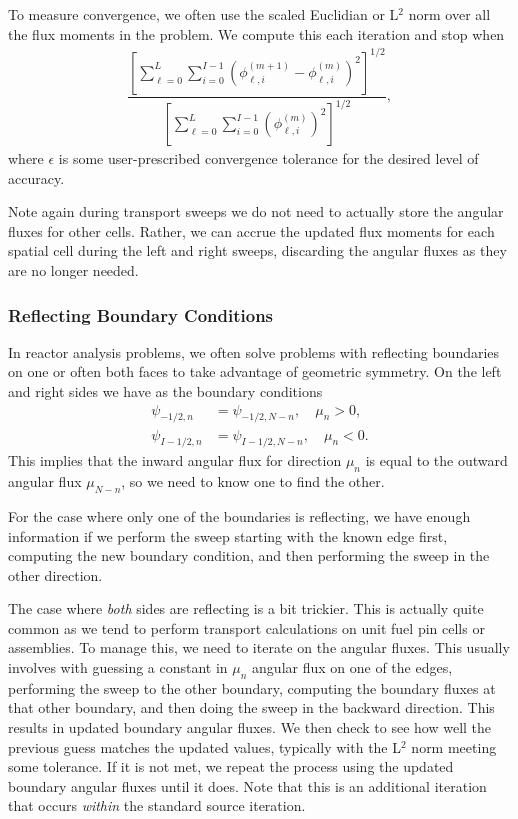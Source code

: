 To measure convergence, we often use the scaled Euclidian or L$^2$ norm over all the flux moments in the problem. We compute this each iteration and stop when
\begin{align}
  \dfrac{ \left[ \displaystyle\sum_{\ell=0}^L \sum_{i=0}^{I-1} \left( \phi_{\ell,i}^{(m+1)} - \phi_{\ell,i}^{(m)} \right)^2 \right]^{1/2} }{ \left[ \displaystyle\sum_{\ell=0}^L \sum_{i=0}^{I-1} \left( \phi_{\ell,i}^{(m)} \right)^2 \right]^{1/2} },
\end{align}
where $\epsilon$ is some user-prescribed convergence tolerance for the desired level of accuracy.

Note again during transport sweeps we do not need to actually store the angular fluxes for other cells. Rather, we can accrue the updated flux moments for each spatial cell during the left and right sweeps, discarding the angular fluxes as they are no longer needed.

\subsubsection{Reflecting Boundary Conditions}

In reactor analysis problems, we often solve problems with reflecting boundaries on one or often both faces to take advantage of geometric symmetry. On the left and right sides we have as the boundary conditions
\begin{subequations}
\begin{align}
  \psi_{-1/2,n}  &= \psi_{-1/2,N-n}, \quad \mu_n > 0, \\
  \psi_{I-1/2,n} &= \psi_{I-1/2,N-n}, \quad \mu_n < 0.
\end{align}
\end{subequations}
This implies that the inward angular flux for direction $\mu_n$ is equal to the outward angular flux $\mu_{N-n}$, so we need to know one to find the other.

For the case where only one of the boundaries is reflecting, we have enough information if we perform the sweep starting with the known edge first, computing the new boundary condition, and then performing the sweep in the other direction. 

The case where \emph{both} sides are reflecting is a bit trickier. This is actually quite common as we tend to perform transport calculations on unit fuel pin cells or assemblies. To manage this, we need to iterate on the angular fluxes. This usually involves with guessing a constant in $\mu_n$ angular flux on one of the edges, performing the sweep to the other boundary, computing the boundary fluxes at that other boundary, and then doing the sweep in the backward direction. This results in updated boundary angular fluxes. We then check to see how well the previous guess matches the updated values, typically with the L$^2$ norm meeting some tolerance. If it is not met, we repeat the process using the updated boundary angular fluxes until it does. Note that this is an additional iteration that occurs \emph{within} the standard source iteration.

